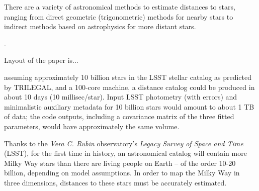 There are a variety of astronomical methods to estimate distances to stars, ranging from direct geometric (trigonometric) methods for nearby stars to indirect methods based on astrophysics for more distant stars. 

.

Layout of the paper is...




 assuming approximately 10 billion stars in the LSST stellar catalog as predicted by TRILEGAL, and a 100-core machine, a distance catalog could be produced in about 10 days (10 millisec/star). Input LSST photometry (with errors) and minimalistic auxiliary metadata  for 10 billion stars would amount to about 1 TB of data; the code outputs, including a covariance matrix of the three fitted parameters, would have approximately the same volume.


 

 
 Thanks to the \textit{Vera C. Rubin} observatory's \textit{Legacy Survey of Space and Time} (LSST), for the first time in history, an astronomical catalog will contain more Milky Way stars than there are living people on Earth -- of the order 10-20 billion, depending on model assumptions. In order to map the Milky Way in three dimensions, distances to these stars must be accurately  estimated.





 